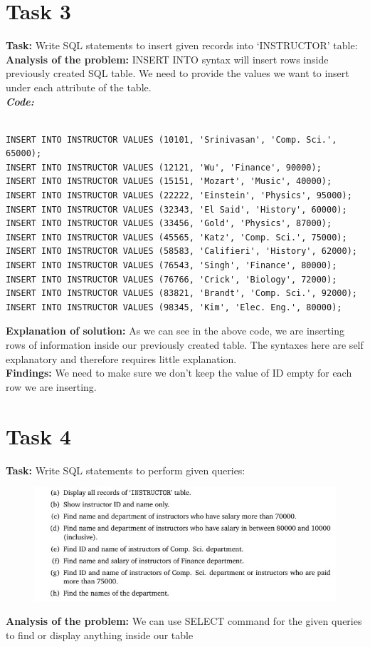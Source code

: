 \documentclass[a4paper, left=1in, right=1in,12pt]{article}
\begin{document}
\section*{Task 3}
\textbf{Task: }Write SQL statements to insert given records into ‘INSTRUCTOR’ table:\newline
\textbf{Analysis of the problem: }INSERT INTO syntax will insert rows inside previously created SQL table. We need to provide the values we want to insert under each attribute of the table.\newline
\\
\textbf{\textit{\large Code:}}
\begin{verbatim}

INSERT INTO INSTRUCTOR VALUES (10101, 'Srinivasan', 'Comp. Sci.', 65000);
INSERT INTO INSTRUCTOR VALUES (12121, 'Wu', 'Finance', 90000);
INSERT INTO INSTRUCTOR VALUES (15151, 'Mozart', 'Music', 40000);
INSERT INTO INSTRUCTOR VALUES (22222, 'Einstein', 'Physics', 95000);
INSERT INTO INSTRUCTOR VALUES (32343, 'El Said', 'History', 60000);
INSERT INTO INSTRUCTOR VALUES (33456, 'Gold', 'Physics', 87000);
INSERT INTO INSTRUCTOR VALUES (45565, 'Katz', 'Comp. Sci.', 75000);
INSERT INTO INSTRUCTOR VALUES (58583, 'Califieri', 'History', 62000);
INSERT INTO INSTRUCTOR VALUES (76543, 'Singh', 'Finance', 80000);
INSERT INTO INSTRUCTOR VALUES (76766, 'Crick', 'Biology', 72000);
INSERT INTO INSTRUCTOR VALUES (83821, 'Brandt', 'Comp. Sci.', 92000);
INSERT INTO INSTRUCTOR VALUES (98345, 'Kim', 'Elec. Eng.', 80000);
\end{verbatim}
\textbf{Explanation of solution: }As we can see in the above code, we are inserting rows of information inside our previously created table. The syntaxes here are self explanatory and therefore requires little explanation.\\
\newline
\textbf{Findings: }We need to make sure we don't keep the value of ID empty for each row we are inserting.



\section*{Task 4}
\textbf{Task: }Write SQL statements to perform given queries:
\begin{figure}[h!]

    \includegraphics[width=\linewidth]{Screenshot 2022-09-03 220456.jpg}
\end{figure}\newline
\textbf{Analysis of the problem: }We can use SELECT command for the given queries to find or display anything inside our table\newline
\end{document}
